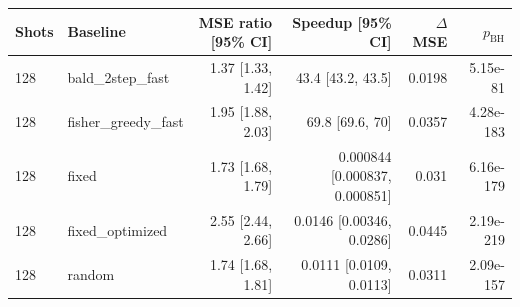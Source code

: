 \begin{tabular}{llrrrr}
\toprule
Shots & Baseline & MSE ratio [95\% CI] & Speedup [95\% CI] & $\Delta$MSE & $p_{\mathrm{BH}}$ \\
\midrule
128 & bald\_2step\_fast & 1.37 [1.33, 1.42] & 43.4 [43.2, 43.5] & 0.0198 & 5.15e-81 \\
128 & fisher\_greedy\_fast & 1.95 [1.88, 2.03] & 69.8 [69.6, 70] & 0.0357 & 4.28e-183 \\
128 & fixed & 1.73 [1.68, 1.79] & 0.000844 [0.000837, 0.000851] & 0.031 & 6.16e-179 \\
128 & fixed\_optimized & 2.55 [2.44, 2.66] & 0.0146 [0.00346, 0.0286] & 0.0445 & 2.19e-219 \\
128 & random & 1.74 [1.68, 1.81] & 0.0111 [0.0109, 0.0113] & 0.0311 & 2.09e-157 \\
\bottomrule
\end{tabular}

